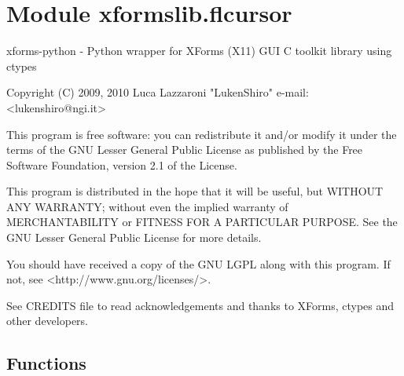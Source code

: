 %
%
%


\section{Module xformslib.flcursor}

    \label{xformslib:flcursor}
xforms-python - Python wrapper for XForms (X11) GUI C toolkit library using
ctypes

Copyright (C) 2009, 2010  Luca Lazzaroni "LukenShiro" e-mail: 
{\textless}lukenshiro@ngi.it{\textgreater}

This program is free software: you can redistribute it and/or modify it 
under the terms of the GNU Lesser General Public License as published by 
the Free Software Foundation, version 2.1 of the License.

This program is distributed in the hope that it will be useful, but WITHOUT
ANY WARRANTY; without even the implied warranty of MERCHANTABILITY or 
FITNESS FOR A PARTICULAR PURPOSE. See the GNU Lesser General Public License
for more details.

You should have received a copy of the GNU LGPL along with this program. If
not, see {\textless}http://www.gnu.org/licenses/{\textgreater}.

See CREDITS file to read acknowledgements and thanks to XForms, ctypes and 
other developers.



  \subsection{Functions}

    \label{xformslib:flcursor:fl_set_cursor}

